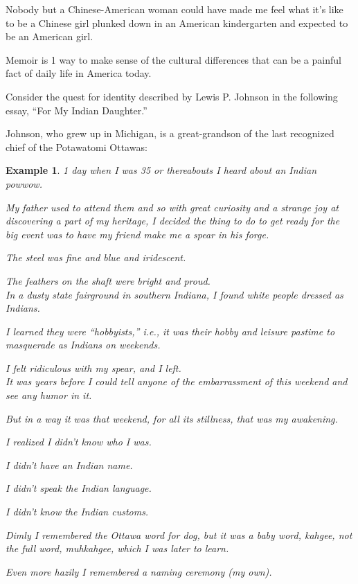 \documentclass{book}
\numberwithin{equation}{section}
\newtheorem{example}{Example}[chapter]
\begin{document}
Nobody but a Chinese-American woman could have made me feel what it's like to be a Chinese girl plunked down in an American kindergarten and expected to be an American girl.

Memoir is 1 way to make sense of the cultural differences that can be a painful fact of daily life in America today.

Consider the quest for identity described by Lewis P. Johnson in the following essay, ``For My Indian Daughter.''

Johnson, who grew up in Michigan, is a great-grandson of the last recognized chief of the Potawatomi Ottawas:
\begin{example}
    1 day when I was 35 or thereabouts I heard about an Indian powwow.
    
    My father used to attend them and so with great curiosity and a strange joy at discovering a part of my heritage, I decided the thing to do to get ready for the big event was to have my friend make me a spear in his forge.
    
    The steel was fine and blue and iridescent.
    
    The feathers on the shaft were bright and proud.
    \\
    
    In a dusty state fairground in southern Indiana, I found white people dressed as Indians.
    
    I learned they were ``hobbyists,'' i.e., it was their hobby and leisure pastime to masquerade as Indians on weekends.
    
    I felt ridiculous with my spear, and I left.
    \\
    
    It was years before I could tell anyone of the embarrassment of this weekend and see any humor in it.
    
    But in a way it was that weekend, for all its stillness, that was my awakening.
    
    I realized I didn't know who I was.
    
    I didn't have an Indian name.
    
    I didn't speak the Indian language.
    
    I didn't know the Indian customs.
    
    Dimly I remembered the Ottawa word for dog, but it was a baby word, \textit{kahgee}, not the full word, \textit{muhkahgee}, which I was later to learn.
    
    Even more hazily I remembered a naming ceremony (my own).
    

\end{example}
\end{document}
